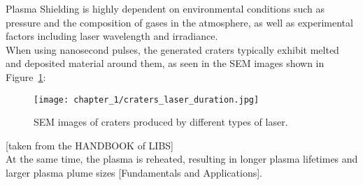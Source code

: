 Plasma Shielding is highly dependent on environmental conditions such as pressure and the composition of gases in the atmosphere, as well as experimental factors including laser wavelength and irradiance.
\\
When using nanosecond pulses, the generated craters typically exhibit melted and deposited material around them, as seen in the SEM images shown in Figure~\ref{fig:craters_laser_duration}:
\begin{figure}[H]
    \centering
    \texttt{[image: chapter\_1/craters\_laser\_duration.jpg]}
    \caption{SEM images of craters produced by different types of laser.}
    \label{fig:craters_laser_duration}
\end{figure}
[taken from the HANDBOOK of LIBS]
\\
At the same time, the plasma is reheated, resulting in longer plasma lifetimes and larger plasma plume sizes [Fundamentals and Applications].
